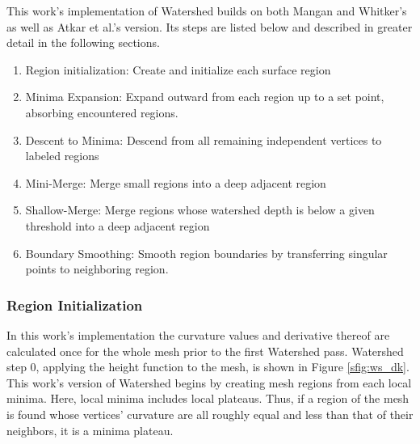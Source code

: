 This work's implementation of Watershed builds on both Mangan and Whitker's as well as Atkar et al.'s version.
Its steps are listed below and described in greater detail in the following sections.
\begin{enumerate}
	\item Region initialization: Create and initialize each surface region
	\item Minima Expansion: Expand outward from each region up to a set point, absorbing encountered regions.
	\item Descent to Minima: Descend from all remaining independent vertices to labeled regions
	\item Mini-Merge: Merge small regions into a deep adjacent region
	\item Shallow-Merge: Merge regions whose watershed depth is below a given threshold into a deep adjacent region
	\item Boundary Smoothing: Smooth region boundaries by transferring singular points to neighboring region.
\end{enumerate}

\subsubsection{Region Initialization}
In this work's implementation the curvature values and derivative thereof are calculated once for the whole mesh prior to the first Watershed pass.
Watershed step 0, applying the height function to the mesh, is shown in Figure \ref{sfig:ws_dk}.
This work's version of Watershed begins by creating mesh regions from each local minima.
Here, local minima includes local plateaus.
Thus, if a region of the mesh is found whose vertices' curvature are all roughly equal and less than that of their neighbors, it is a minima plateau.


